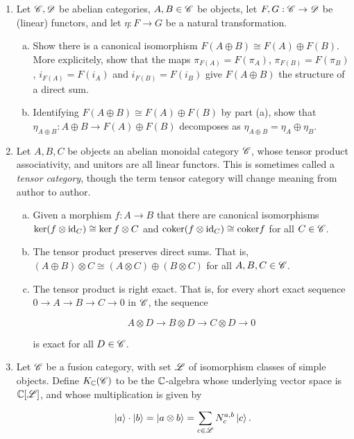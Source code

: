 \documentclass{article}
\theoremstyle{definition}
\numberwithin{figure}{section}
\begin{document}
\begin{enumerate}[\thesection .1.]
\item Let $\mathscr{C},\mathscr{D}$ be abelian categories, $A,B\in \mathscr{C}$ be objects, let $F,G:\mathscr{C}\to \mathscr{D}$ be (linear) functors, and let $\eta:F\to G$ be a natural transformation.

\begin{enumerate}[(a)]
\item Show there is a canonical isomorphism $F(A\oplus B)\cong F(A)\oplus F(B)$. More explicitely, show that the maps $\pi_{F(A)}=F(\pi_A)$, $\pi_{F(B)}=F(\pi_B)$, $i_{F(A)}=F(i_A)$ and $i_{F(B)}=F(i_B)$ give $F(A\oplus B)$ the structure of a direct sum.
\item Identifying $F(A\oplus B)\cong F(A)\oplus F(B)$ by part (a), show that $\eta_{A\oplus B}:A\oplus B\to F(A)\oplus F(B)$ decomposes as $\eta_{A\oplus B}=\eta_{A}\oplus \eta_{B}$.
\end{enumerate}

\item Let $A,B,C$ be objects an abelian monoidal category $\mathscr{C}$, whose tensor product associativity, and unitors are all linear functors. This is sometimes called a \textit{tensor category}, though the term tensor category will change meaning from author to author.

\begin{enumerate}[(a)]

\item Given a morphism $f:A\to B$ that there are canonical isomorphisms $\ker (f\otimes \mathrm{id}_C)\cong \ker f\otimes C$ and $\mathrm{coker} (f\otimes \mathrm{id}_C)\cong \mathrm{coker} f$ for all $C\in \mathscr{C}$.
\item The tensor product preserves direct sums. That is, $(A\oplus B)\otimes C\cong (A\otimes C)\oplus (B\otimes C) $ for all $A,B,C\in \mathscr{C}$.
\item The tensor product is right exact. That is, for every short exact sequence $0\to A\to B\to C\to 0$ in $\mathscr{C}$, the sequence

$$A\otimes D\to B\otimes D\to C\otimes D\to 0$$

is exact for all $D\in \mathscr{C}$.
\end{enumerate}

\item Let $\mathscr{C}$ be a fusion category, with set $\mathscr{L}$ of isomorphism classes of simple objects. Define $K_{\mathbb{C}}(\mathscr{C})$ to be the $\mathbb{C}$-algebra whose underlying vector space is $\mathbb{C}[\mathscr{L}]$, and whose multiplication is given by

$$\left|a\right>\cdot \left| b\right>=\left| a\otimes b\right>=\sum_{c\in \mathscr{L}}N^{a,b}_{c}\left| c\right>.$$


\end{enumerate}
\end{document}
